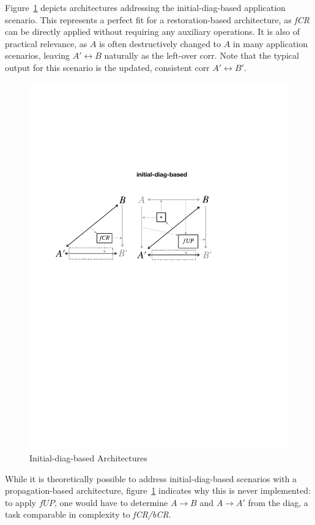 Figure~\ref{fig:initialDiagBased} depicts architectures addressing the initial-diag-based application scenario.
This represents a perfect fit for a restoration-based architecture, as \emph{fCR} can be directly applied without requiring any auxiliary operations.
It is also of practical relevance, as $A$ is often destructively changed to $A$ in many application scenarios, leaving $A' \leftrightarrow B$ naturally as the left-over corr. 
Note that the typical output for this scenario is the updated, consistent corr $A' \leftrightarrow B'$.
%
\begin{figure}[tb!]
	\centering
	\includegraphics[width=0.755\columnwidth]{diagrams/foundations/initial-diag-based}
	\caption{Initial-diag-based Architectures}
	\label{fig:initialDiagBased}
\end{figure}
%
While it is theoretically possible to address initial-diag-based scenarios with a propagation-based architecture, figure~\ref{fig:initialDiagBased} indicates why this is never implemented: to apply $fUP$, one would have to determine $A \rightarrow B$ and $A \rightarrow A'$ from the diag, a task  comparable in complexity to \emph{fCR/bCR}.

